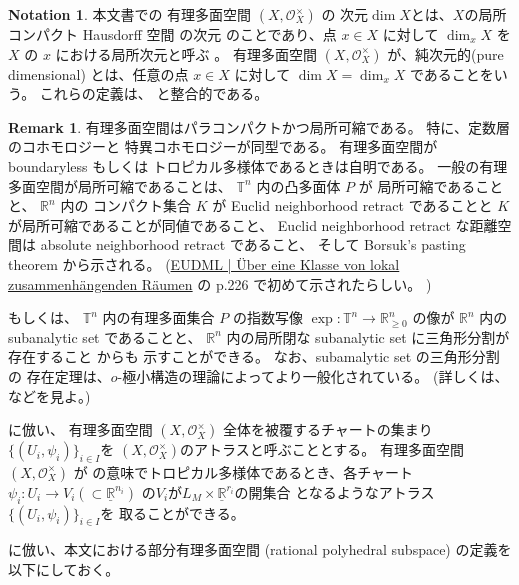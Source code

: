 \documentclass[a4paper,dvipdfmx,reqno,12pt]{amsart}
\theoremstyle{definition}
\newtheorem{notation}[theorem]{Notation}
\newtheorem{remark}[theorem]{Remark}
\newcommand{\opn}[1]{\operatorname{#1}}
\numberwithin{equation}{section}
\begin{document}
\begin{notation}
本文書での
有理多面空間 $(X,\mathcal{O}_X^{\times})$ 
\cite[Definition 2.2]{MR4246795} の
次元$\dim X$とは、$X$の局所コンパクト Hausdorff 空間
の次元\cite[Chapter III. Definition 9.4]{MR842190}
のことであり、点 $x\in X$ に対して
$\dim_x X$ を $X$ の $x$ における局所次元と呼ぶ
\cite[Chapter III. Definition 9.10]{MR842190}。
有理多面空間
$(X,\mathcal{O}_X^{\times})$
が、純次元的(pure dimensional)
とは、任意の点 $x\in X$ に対して
$\dim X=\dim_x X$ であることをいう。
これらの定義は、
\cite[Definition 7.1.1]{mikhalkin2018tropical}
と整合的である。
\end{notation}

\begin{remark}
有理多面空間はパラコンパクトかつ局所可縮である。
特に、定数層のコホモロジーと
特異コホモロジーが同型である。
有理多面空間が
boundaryless もしくは
トロピカル多様体であるときは自明である。
一般の有理多面空間が局所可縮であることは、
$\mathbb{T}^{n}$ 内の凸多面体 $P$ が
局所可縮であることと、
$\mathbb{R}^{n}$ 内の コンパクト集合 $K$ が Euclid 
neighborhood retract であることと
$K$が局所可縮であることが同値であること、
Euclid neighborhood retract な距離空間は
absolute neighborhood retract であること、
そして Borsuk's pasting theorem から示される。
(\href{https://eudml.org/doc/212574}{EUDML | Über eine Klasse von lokal zusammenhängenden Räumen}
の p.226 で初めて示されたらしい。
)

もしくは、
$\mathbb{T}^{n}$ 内の有理多面集合 $P$ の指数写像
$\opn{exp}\colon \mathbb{T}^{n}\to 
\mathbb{R}^{n}_{\geq 0}$ の像が $\mathbb{R}^{n}$
内の subanalytic set であることと、
$\mathbb{R}^{n}$ 内の局所閉な
subanalytic set に三角形分割が存在すること
\cite{MR760983} からも
示すことができる。
なお、subamalytic set の三角形分割の
存在定理は、$o$-極小構造の理論によってより一般化されている。
(詳しくは、\cite[Theorem II]{MR1463945} などを見よ。)
\end{remark}

\cite{demedrano2023chern}に倣い、
有理多面空間 $(X,\mathcal{O}_X^{\times})$
全体を被覆するチャートの集まり
$\{(U_i,\psi_i)\}_{i\in I}$を
$(X,\mathcal{O}_X^{\times})$のアトラスと呼ぶこととする。
有理多面空間$(X,\mathcal{O}_X^{\times})$ が
\cite[Definition 6.1]{gross2019sheaftheoretic}
の意味でトロピカル多様体であるとき、各チャート
$\psi_i\colon U_i\to V_i(\subset \underline{\mathbb{R}}^{n_i})$
の$V_i$が$L_M\times \underline{\mathbb{R}}^{r_i}$の開集合
となるようなアトラス$\{(U_i,\psi_i)\}_{i\in I}$を
取ることができる。

\cite[Definition 2.14]{demedrano2023chern}
に倣い、本文における部分有理多面空間
(rational polyhedral subspace)
の定義を以下にしておく。
\end{document}

